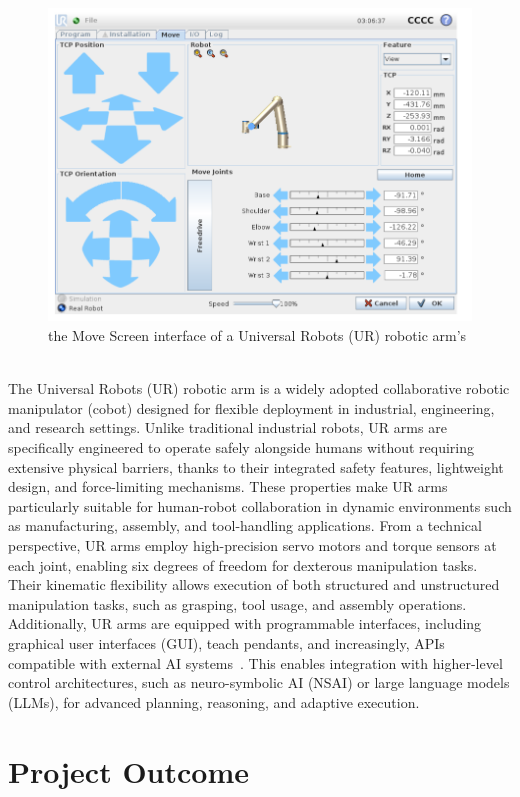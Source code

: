 \documentclass[12pt]{extarticle}
\begin{document}
\begin{figure}[htbp]
    \centering
    \includegraphics[width=0.8\linewidth]{images/UR_Arm_pic.png}
    \caption{the Move Screen interface of a Universal Robots (UR) robotic arm's ~\cite{urarm}}
    \label{fig:urarm}
\end{figure}

The Universal Robots (UR) robotic arm is a widely adopted collaborative robotic manipulator (cobot) designed for flexible deployment in industrial, engineering, and research settings. Unlike traditional industrial robots, UR arms are specifically engineered to operate safely alongside humans without requiring extensive physical barriers, thanks to their integrated safety features, lightweight design, and force-limiting mechanisms. These properties make UR arms particularly suitable for human-robot collaboration in dynamic environments such as manufacturing, assembly, and tool-handling applications.
From a technical perspective, UR arms employ high-precision servo motors and torque sensors at each joint, enabling six degrees of freedom for dexterous manipulation tasks. Their kinematic flexibility allows execution of both structured and unstructured manipulation tasks, such as grasping, tool usage, and assembly operations. Additionally, UR arms are equipped with programmable interfaces, including graphical user interfaces (GUI), teach pendants, and increasingly, APIs compatible with external AI systems~\cite{urarm}. This enables integration with higher-level control architectures, such as neuro-symbolic AI (NSAI) or large language models (LLMs), for advanced planning, reasoning, and adaptive execution.


\newpage
\section{Project Outcome}
\end{document}
